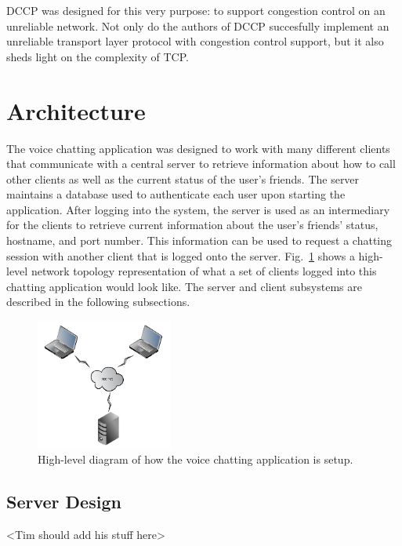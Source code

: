 \documentclass[letterpaper, 9 pt, balance, conference]{ieeeconf}
\begin{document}
DCCP was designed for this very purpose: to support congestion control on an 
unreliable network.  Not only do the authors of DCCP succesfully implement an 
unreliable transport layer protocol with congestion control support, but it also 
sheds light on the complexity of TCP.

\section{Architecture}
\label{sec:architec}

The voice chatting application was designed to work with many different clients
that communicate with a central server to retrieve information about how to call
other clients as well as the current status of the user's friends. The server 
maintains a database used to authenticate each user upon starting the application.
After logging into the system, the server is used as an intermediary for the clients
to retrieve current information about the user's friends' status, hostname, and
port number. This information can be used to request a chatting session with another
client that is logged onto the server.  Fig.~\ref{fig:setup} shows a high-level
network topology representation of what a set of clients logged into this chatting 
application would look like.  The server and client subsystems are described in
the following subsections.

\begin{figure}[h]
   \centering
      \includegraphics[width=0.4\textwidth]{pics/setup}
   \caption{High-level diagram of how the voice chatting application is setup.}
\label{fig:setup}
\end{figure}


\subsection{Server Design}
\label{subsec:server_des}

<Tim should add his stuff here>
\end{document}
